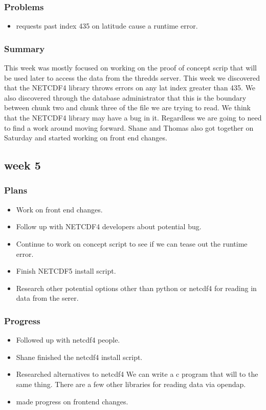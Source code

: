 \documentclass[onecolumn, draftclsnofoot,10pt, compsoc]{article}
\begin{document}
			\subsubsection{Problems}
				\begin{itemize}
					\item requests past index 435 on latitude cause a runtime error.
				\end{itemize}
			\subsubsection{Summary}
			This week was mostly focused on working on the proof of concept scrip that will be used later to access the data from the thredds server. This week we discovered that the NETCDF4 library throws errors on any lat index greater than 435. We also discovered through the database administrator that this is the boundary between chunk two and chunk three of the file we are trying to read. We think that the NETCDF4 library may have a bug in it. Regardless we are going to need to find a work around moving forward. Shane and Thomas also got together on Saturday and started working on front end changes.\\
						
		\subsection{week 5}
			\subsubsection{Plans}
				\begin{itemize}
					\item Work on front end changes.
					\item Follow up with NETCDF4 developers about potential bug.
					\item Continue to work on concept script to see if we can tease out the runtime error.
					\item Finish NETCDF5 install script.
					\item Research other potential options other than python or netcdf4 for reading in data from the serer.\\
				
				\end{itemize}
			\subsubsection{Progress}
				\begin{itemize}
					\item Followed up with netcdf4 people.
					\item Shane finished the netcdf4 install script.
					\item Researched alternatives to netcdf4 We can write a c program that will to the same thing. There are a few other libraries for reading data via opendap.
					\item made progress on frontend changes.
				\end{itemize}
				
\end{document}
